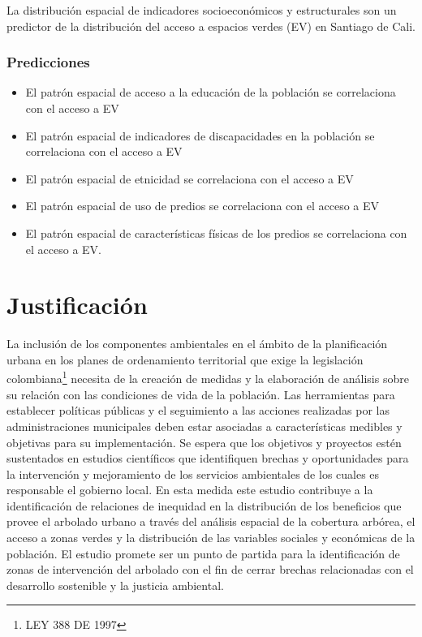 \documentclass[12pt,]{book}
\providecommand{\tightlist}{%
  \setlength{\itemsep}{0pt}\setlength{\parskip}{0pt}}
\let\rmarkdownfootnote\footnote%
\def\footnote{\protect\rmarkdownfootnote}
\begin{document}
La distribución espacial de indicadores socioeconómicos y estructurales
son un predictor de la distribución del acceso a espacios verdes (EV) en
Santiago de Cali.

\subsubsection{Predicciones}\label{predicciones-1}

\begin{itemize}
\tightlist
\item
  El patrón espacial de acceso a la educación de la población se
  correlaciona con el acceso a EV
\item
  El patrón espacial de indicadores de discapacidades en la población se
  correlaciona con el acceso a EV
\item
  El patrón espacial de etnicidad se correlaciona con el acceso a EV
\item
  El patrón espacial de uso de predios se correlaciona con el acceso a
  EV
\item
  El patrón espacial de características físicas de los predios se
  correlaciona con el acceso a EV.
\end{itemize}

\section{Justificación}\label{justificacion}

La inclusión de los componentes ambientales en el ámbito de la
planificación urbana en los planes de ordenamiento territorial que exige
la legislación colombiana\footnote{LEY 388 DE 1997} necesita de la
creación de medidas y la elaboración de análisis sobre su relación con
las condiciones de vida de la población. Las herramientas para
establecer políticas públicas y el seguimiento a las acciones realizadas
por las administraciones municipales deben estar asociadas a
características medibles y objetivas para su implementación. Se espera
que los objetivos y proyectos estén sustentados en estudios científicos
que identifiquen brechas y oportunidades para la intervención y
mejoramiento de los servicios ambientales de los cuales es responsable
el gobierno local. En esta medida este estudio contribuye a la
identificación de relaciones de inequidad en la distribución de los
beneficios que provee el arbolado urbano a través del análisis espacial
de la cobertura arbórea, el acceso a zonas verdes y la distribución de
las variables sociales y económicas de la población. El estudio promete
ser un punto de partida para la identificación de zonas de intervención
del arbolado con el fin de cerrar brechas relacionadas con el desarrollo
sostenible y la justicia ambiental.
\end{document}
